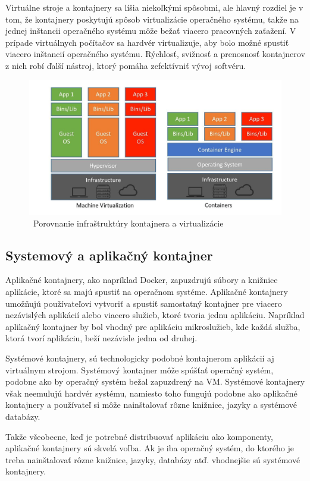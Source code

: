 Virtuálne stroje a kontajnery sa líšia niekoľkými spôsobmi, ale hlavný rozdiel je v tom, že kontajnery poskytujú spôsob virtualizácie operačného systému, takže na jednej inštancii operačného systému môže bežať viacero pracovných zaťažení. V prípade virtuálnych počítačov sa hardvér virtualizuje, aby bolo možné spustiť viacero inštancií operačného systému. Rýchlosť, svižnosť a prenosnosť kontajnerov z nich robí ďalší nástroj, ktorý pomáha zefektívniť vývoj softvéru.

\begin{figure}[!ht]
    \includegraphics[width=.9\textwidth]{figures/containervsvirtual}
    \caption{\ Porovnanie infraštruktúry kontajnera a virtualizácie \cite{containervsvirtual} \label{o:latex_friendly_zone}}
\end{figure}

\subsection{Systemový a aplikačný kontajner}

Aplikačné kontajnery, ako napríklad Docker, zapuzdrujú súbory a knižnice aplikácie, ktoré sa majú spustiť na operačnom systéme. Aplikačné kontajnery umožňujú používateľovi vytvoriť a spustiť samostatný kontajner pre viacero nezávislých aplikácií alebo viacero služieb, ktoré tvoria jednu aplikáciu. Napríklad aplikačný kontajner by bol vhodný pre aplikáciu mikroslužieb, kde každá služba, ktorá tvorí aplikáciu, beží nezávisle jedna od druhej.

Systémové kontajnery, sú technologicky podobné kontajnerom aplikácií aj virtuálnym strojom. Systémový kontajner môže spúšťať operačný systém, podobne ako by operačný systém bežal zapuzdrený na VM. Systémové kontajnery však neemulujú hardvér systému, namiesto toho fungujú podobne ako aplikačné kontajnery a používateľ si môže nainštalovať rôzne knižnice, jazyky a systémové databázy. \cite{systemvsapli}

Takže všeobecne, keď je potrebné distribuovať aplikáciu ako komponenty, aplikačné kontajnery sú skvelá voľba. Ak je iba operačný systém, do ktorého je treba nainštalovať rôzne knižnice, jazyky, databázy atď. vhodnejšie sú systémové kontajnery.




\clearpage
